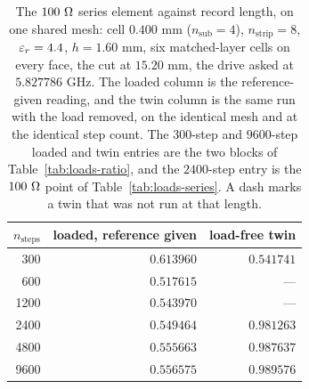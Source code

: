 \begin{table}[H]
  \centering
  \caption{The $100\ \Omega$ series element against record length, on one shared mesh: cell $0.400$ mm
  ($n_{\mathrm{sub}} = 4$), $n_{\mathrm{strip}} = 8$, $\varepsilon_r = 4.4$, $h = 1.60$ mm, six matched-layer cells on
  every face, the cut at $15.20$ mm, the drive asked at $5.827786$ GHz. The loaded column is the reference-given
  reading, and the twin column is the same run with the load removed, on the identical mesh and at the identical
  step count. The $300$-step and $9600$-step loaded and twin entries are the two blocks of
  Table~\ref{tab:loads-ratio}, and the $2400$-step entry is the $100\ \Omega$ point of Table~\ref{tab:loads-series}. A dash marks a twin that was not
  run at that length.}
  \label{tab:loads-length}
  \begin{tabular}{@{}rrr@{}}
    \toprule
    $n_{\mathrm{steps}}$ & loaded, reference given & load-free twin \\
    \midrule
     300 & $0.613960$ & $0.541741$ \\
     600 & $0.517615$ & --- \\
    1200 & $0.543970$ & --- \\
    2400 & $0.549464$ & $0.981263$ \\
    4800 & $0.555663$ & $0.987637$ \\
    9600 & $0.556575$ & $0.989576$ \\
    \bottomrule
  \end{tabular}
\end{table}

